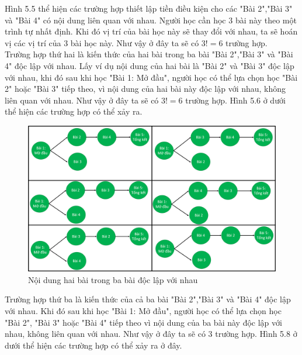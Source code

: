 Hình 5.5 thể hiện các trường hợp thiết lập tiền điều kiện cho các "Bài 2","Bài 3" và "Bài 4" có nội dung liên quan với nhau. Người học cần học 3 bài này theo một trình tự nhất định. Khi đó vị trí của bài học này sẽ thay đổi với nhau, ta sẽ hoán vị các vị trí của 3 bài học này. Như vậy ở đây ta sẽ có $3!=6$ trường hợp.\\

Trường hợp thứ hai là kiến thức của hai bài trong ba bài "Bài 2","Bài 3" và "Bài 4" độc lập với nhau. Lấy ví dụ nội dung của hai bài là "Bài 2" và "Bài 3" độc lập với nhau, khi đó sau khi học "Bài 1: Mở đầu", người học có thể lựa chọn học "Bài 2" hoặc "Bài 3" tiếp theo, vì nội dung của hai bài này độc lập với nhau, không liên quan với nhau. Như vậy ở đây ta sẽ có $3!=6$ trường hợp. Hình 5.6 ở dưới thể hiện các trường hợp có thể xảy ra.

\newpage

\begin{center}
	\begin{figure}[htp]
		\begin{center}
			\includegraphics[width=16cm]{Chapter5/Pictures/picture56.png}
		\end{center}
		\caption{Nội dung hai bài trong ba bài độc lập với nhau}
		\label{refhinhchuong66}
	\end{figure}
\end{center}	



Trường hợp thứ ba là kiến thức của cả ba bài "Bài 2","Bài 3" và "Bài 4" độc lập với nhau. Khi đó sau khi học "Bài 1: Mở đầu", người học có thể lựa chọn học "Bài 2", "Bài 3" hoặc "Bài 4" tiếp theo vì nội dung của ba bài này độc lập với nhau, không liên quan với nhau. Như vậy ở đây ta sẽ có $3$ trường hợp. Hình 5.8 ở dưới thể hiện các trường hợp có thể xảy ra ở đây.

